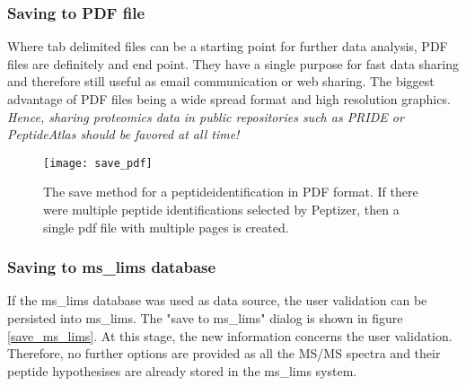 \subsubsection{Saving to PDF file}
\npar Where tab delimited files can be a starting point for further data analysis,  PDF files are definitely and end point. They have a single purpose for fast data sharing and therefore still useful as email communication or web sharing. The biggest advantage of PDF files being a wide spread format and high resolution graphics. \textit{Hence, sharing proteomics data in public repositories such as PRIDE or PeptideAtlas should be favored at all time!}
%
\begin{figure}[H]
\begin{center}
	\texttt{[image: save\_pdf]}
	\caption{\label{save_pdf}The save method for a peptideidentification in PDF format. If there were multiple peptide identifications selected by Peptizer, then a single pdf file with multiple pages is created. }
\end{center}
\end{figure}
%
%
\subsubsection{Saving to ms\_lims database}
\npar If the ms\_lims database was used as data source, the user validation can be persisted into ms\_lims. The "save to ms\_lims" dialog is shown in figure \ref{save_ms_lims}. At this stage, the new information concerns the user validation. Therefore, no further options are provided as all the MS/MS spectra and their peptide hypothesises are already stored in the ms\_lims system.
%
%
